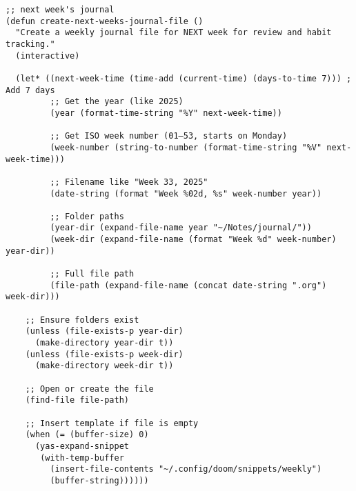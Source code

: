 \documentclass[11pt]{article}
\begin{document}
\begin{verbatim}
;; next week's journal
(defun create-next-weeks-journal-file ()
  "Create a weekly journal file for NEXT week for review and habit tracking."
  (interactive)

  (let* ((next-week-time (time-add (current-time) (days-to-time 7))) ; Add 7 days
         ;; Get the year (like 2025)
         (year (format-time-string "%Y" next-week-time))

         ;; Get ISO week number (01–53, starts on Monday)
         (week-number (string-to-number (format-time-string "%V" next-week-time)))

         ;; Filename like "Week 33, 2025"
         (date-string (format "Week %02d, %s" week-number year))

         ;; Folder paths
         (year-dir (expand-file-name year "~/Notes/journal/"))
         (week-dir (expand-file-name (format "Week %d" week-number) year-dir))

         ;; Full file path
         (file-path (expand-file-name (concat date-string ".org") week-dir)))

    ;; Ensure folders exist
    (unless (file-exists-p year-dir)
      (make-directory year-dir t))
    (unless (file-exists-p week-dir)
      (make-directory week-dir t))

    ;; Open or create the file
    (find-file file-path)

    ;; Insert template if file is empty
    (when (= (buffer-size) 0)
      (yas-expand-snippet
       (with-temp-buffer
         (insert-file-contents "~/.config/doom/snippets/weekly")
         (buffer-string))))))
\end{verbatim}
\end{document}
